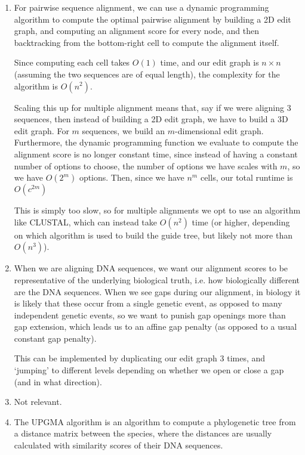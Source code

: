 


\begin{enumerate}[label=(\alph*)]

  \item
    For pairwise sequence alignment, we can use a dynamic programming algorithm to compute the optimal pairwise alignment by building a 2D edit graph, and computing an alignment score for every node, and then backtracking from the bottom-right cell to compute the alignment itself.

    Since computing each cell takes $O(1)$ time, and our edit graph is $n \times n$ (assuming the two sequences are of equal length), the complexity for the algorithm is $O(n^2)$.

    Scaling this up for multiple alignment means that, say if we were aligning 3 sequences, then instead of building a 2D edit graph, we have to build a 3D edit graph. For $m$ sequences, we build an $m$-dimensional edit graph. Furthermore, the dynamic programming function we evaluate to compute the alignment score is no longer constant time, since instead of having a constant number of options to choose, the number of options we have scales with $m$, so we have $O(2^m)$ options. Then, since we have $n^m$ cells, our total runtime is $O(c^{2m})$

    This is simply too slow, so for multiple alignments we opt to use an algorithm like CLUSTAL, which can instead take $O(n^2)$ time (or higher, depending on which algorithm is used to build the guide tree, but likely not more than $O(n^3)$).

    \item
      When we are aligning DNA sequences, we want our alignment scores to be representative of the underlying biological truth, i.e. how biologically different are the DNA sequences. When we see gaps during our alignment, in biology it is likely that these occur from a single genetic event, as opposed to many independent genetic events, so we want to punish gap openings more than gap extension, which leads us to an affine gap penalty (as opposed to a usual constant gap penalty).

      This can be implemented by duplicating our edit graph 3 times, and `jumping' to different levels depending on whether we open or close a gap (and in what direction).

      \item
        Not relevant.

        \item
The UPGMA algorithm is an algorithm to compute a phylogenetic tree from a distance matrix between the species, where the distances are usually calculated with similarity scores of their DNA sequences.



\end{enumerate}

